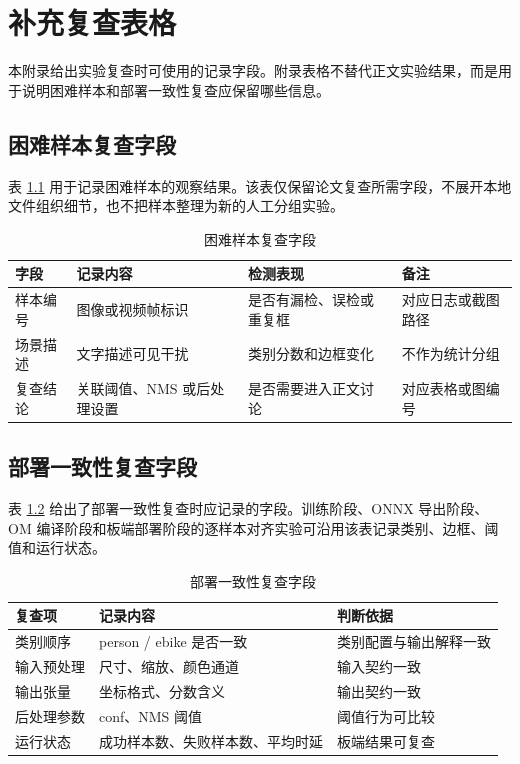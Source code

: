\chapter{补充复查表格}
\label{cha:appendix_review_tables}

本附录给出实验复查时可使用的记录字段。附录表格不替代正文实验结果，而是用于说明困难样本和部署一致性复查应保留哪些信息。

\section{困难样本复查字段}

表 \ref{tab:appendix_hardcase_template} 用于记录困难样本的观察结果。该表仅保留论文复查所需字段，不展开本地文件组织细节，也不把样本整理为新的人工分组实验。

\begin{table}[htbp]
    \centering
    \caption{困难样本复查字段}
    \label{tab:appendix_hardcase_template}
    \begin{tabular}{p{2.5cm} p{3.2cm} p{3.2cm} p{3.0cm}}
        \toprule
        字段 & 记录内容 & 检测表现 & 备注 \\
        \midrule
        样本编号 & 图像或视频帧标识 & 是否有漏检、误检或重复框 & 对应日志或截图路径 \\
        场景描述 & 文字描述可见干扰 & 类别分数和边框变化 & 不作为统计分组 \\
        复查结论 & 关联阈值、NMS 或后处理设置 & 是否需要进入正文讨论 & 对应表格或图编号 \\
        \bottomrule
    \end{tabular}
\end{table}

\section{部署一致性复查字段}

表 \ref{tab:appendix_deploy_check} 给出了部署一致性复查时应记录的字段。训练阶段、ONNX 导出阶段、OM 编译阶段和板端部署阶段的逐样本对齐实验可沿用该表记录类别、边框、阈值和运行状态。

\begin{table}[htbp]
    \centering
    \caption{部署一致性复查字段}
    \label{tab:appendix_deploy_check}
    \begin{tabular}{p{2.8cm} p{4.0cm} p{4.2cm}}
        \toprule
        复查项 & 记录内容 & 判断依据 \\
        \midrule
        类别顺序 & person / ebike 是否一致 & 类别配置与输出解释一致 \\
        输入预处理 & 尺寸、缩放、颜色通道 & 输入契约一致 \\
        输出张量 & 坐标格式、分数含义 & 输出契约一致 \\
        后处理参数 & conf、NMS 阈值 & 阈值行为可比较 \\
        运行状态 & 成功样本数、失败样本数、平均时延 & 板端结果可复查 \\
        \bottomrule
    \end{tabular}
\end{table}
